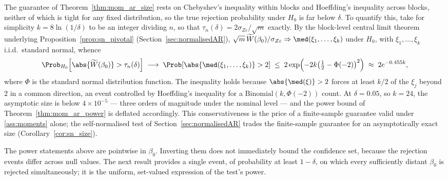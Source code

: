 \begin{remark}
\label{rem:oracle_conservative}
The guarantee of Theorem~\ref{thm:mom_ar_size} rests on Chebyshev's inequality within blocks and Hoeffding's inequality across blocks, neither of which is tight for any fixed distribution, so the true rejection probability under $H_0$ is far below $\delta$. To quantify this, take for simplicity $k = 8\ln(1/\delta)$ to be an integer dividing $n$, so that $\tau_n(\delta) = 2\sigma_{Z\varepsilon}/\sqrt{m}$ exactly. By the block-level central limit theorem underlying Proposition~\ref{prop:sn_pivotal} (Section~\ref{sec:normalisedAR}), $\sqrt{m}\,\widetilde{W}(\beta_0)/\sigma_{Z\varepsilon} \Rightarrow \med(\xi_1,\dots,\xi_k)$ under $H_0$, with $\xi_1,\dots,\xi_k$ i.i.d.\ standard normal, whence
\[
  \Prob_{H_0}\!\left[\abs{\widetilde{W}(\beta_0)} > \tau_n(\delta)\right]
  \;\longrightarrow\;
  \Prob\!\left[\abs{\med(\xi_1,\dots,\xi_k)} > 2\right]
  \;\le\; 2\exp\!\left(-2k\bigl(\tfrac{1}{2} - \Phi(-2)\bigr)^{2}\right)
  \;\approx\; 2e^{-0.455k},
\]
where $\Phi$ is the standard normal distribution function. The inequality holds because $\abs{\med(\xi)} > 2$ forces at least $k/2$ of the $\xi_j$ beyond $2$ in a common direction, an event controlled by Hoeffding's inequality for a $\mathrm{Binomial}(k,\Phi(-2))$ count. At $\delta = 0.05$, so $k = 24$, the asymptotic size is below $4\times10^{-5}$ --- three orders of magnitude under the nominal level --- and the power bound of Theorem~\ref{thm:mom_ar_power} is deflated accordingly. This conservativeness is the price of a finite-sample guarantee valid under \ref{ass:moments} alone; the self-normalised test of Section~\ref{sec:normalisedAR} trades the finite-sample guarantee for an asymptotically exact size (Corollary~\ref{cor:sn_size}).
\end{remark}

The power statements above are pointwise in $\beta_0$. Inverting them does not immediately bound the confidence set, because the rejection events differ across null values. The next result provides a single event, of probability at least $1-\delta$, on which every sufficiently distant $\beta_0$ is rejected simultaneously; it is the uniform, set-valued expression of the test's power.

